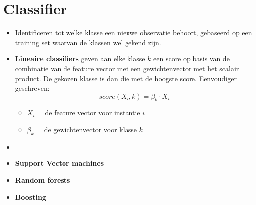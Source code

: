 \section{Classifier}
\begin{itemize}
	\item Identificeren tot welke klasse een \underline{nieuwe} observatie behoort, gebaseerd op een training set waarvan de klassen wel gekend zijn.
	\item \textbf{Lineaire classifiers} geven aan elke klasse $k$ een score op basis van de combinatie van de feature vector met een gewichtenvector met het scalair product.  De gekozen klasse is dan die met de hoogste score. Eenvoudiger geschreven:	
	$$
	score(X_i, k) = \beta_k \cdot X_i
	$$
	\begin{itemize}
		\item $X_i$ = de feature vector voor instantie $i$
		\item $\beta_k$ = de gewichtenvector voor klasse $k$
	\end{itemize}
	\item {}
	\item \textbf{Support Vector machines}
	\item \textbf{Random forests}
	\item \textbf{Boosting}
\end{itemize}




